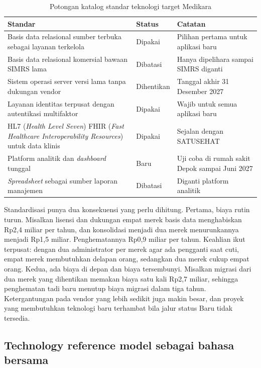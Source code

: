 \begin{table}[!htb]
  \centering
  \caption{Potongan katalog standar teknologi target Medikara}
  \label{tab:ch10-katalog}
  \small
  \begin{tabularx}{\textwidth}{XlX}
    \hline
    \textbf{Standar} & \textbf{Status} & \textbf{Catatan} \\
    \hline
    Basis data relasional sumber terbuka sebagai layanan terkelola & Dipakai & Pilihan pertama untuk aplikasi baru \\
    \hline
    Basis data relasional komersial bawaan SIMRS lama & Dibatasi & Hanya dipelihara sampai SIMRS diganti \\
    \hline
    Sistem operasi server versi lama tanpa dukungan vendor & Dihentikan & Tanggal akhir 31 Desember 2027 \\
    \hline
    Layanan identitas terpusat dengan autentikasi multifaktor & Dipakai & Wajib untuk semua aplikasi baru \\
    \hline
    HL7 (\textit{Health Level Seven}) FHIR (\textit{Fast Healthcare Interoperability Resources}) untuk data klinis & Dipakai & Sejalan dengan SATUSEHAT \\
    \hline
    Platform analitik dan \textit{dashboard} tunggal & Baru & Uji coba di rumah sakit Depok sampai Juni 2027 \\
    \hline
    \textit{Spreadsheet} sebagai sumber laporan manajemen & Dibatasi & Diganti platform analitik \\
    \hline
  \end{tabularx}
\end{table}

Standardisasi punya dua konsekuensi yang perlu dihitung. Pertama, biaya rutin
turun. Misalkan lisensi dan dukungan empat merek basis data menghabiskan
Rp2,4 miliar per tahun, dan konsolidasi menjadi dua merek menurunkannya
menjadi Rp1,5 miliar. Penghematannya Rp0,9 miliar per tahun. Keahlian ikut
terpusat: dengan dua administrator per merek agar ada pengganti saat cuti,
empat merek membutuhkan delapan orang, sedangkan dua merek cukup empat orang.
Kedua, ada biaya di depan dan biaya tersembunyi. Misalkan migrasi dari dua
merek yang dihentikan memakan biaya satu kali Rp2,7 miliar, sehingga
penghematan tadi baru menutup biaya migrasi dalam tiga tahun. Ketergantungan
pada vendor yang lebih sedikit juga makin besar, dan proyek yang membutuhkan
teknologi baru terhambat bila jalur status Baru tidak tersedia.

\subsection*{Technology reference model sebagai bahasa bersama}

